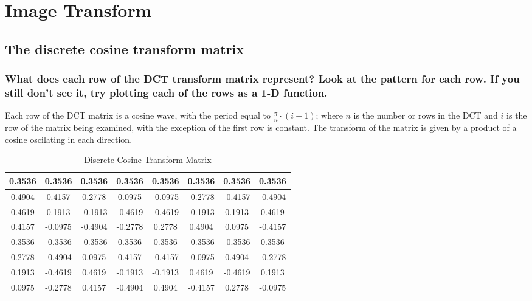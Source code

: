 \section{Image Transform}

\subsection{The discrete cosine transform matrix}

\subsubsection{What does each row of the DCT transform matrix represent? Look at the pattern for each row. If you still don't see it, try plotting each of the rows as a 1-D function.}
Each row of the DCT matrix is a cosine wave, with the period equal to $\frac{\pi}{n} \cdot (i-1)$; where $n$ is the number or rows in the DCT and $i$ is the row of the matrix being examined, with the exception of the first row is constant. The transform of the matrix is given by a product of a cosine oscilating in each direction.

\begin{table}[tbhc]
	\caption{Discrete Cosine Transform Matrix}
	\label{tbl:dctm}
	\begin{center}
		\begin{tabular}{ c | c | c | c | c | c | c | c}
0.3536	&	0.3536	&	0.3536	&	0.3536	&	0.3536	&	0.3536	&	0.3536	&	0.3536	\\
\hline
0.4904	&	0.4157	&	0.2778	&	0.0975	&	-0.0975	&	-0.2778	&	-0.4157	&	-0.4904	\\
\hline
0.4619	&	0.1913	&	-0.1913	&	-0.4619	&	-0.4619	&	-0.1913	&	0.1913	&	0.4619	\\
\hline
0.4157	&	-0.0975	&	-0.4904	&	-0.2778	&	0.2778	&	0.4904	&	0.0975	&	-0.4157	\\
\hline
0.3536	&	-0.3536	&	-0.3536	&	0.3536	&	0.3536	&	-0.3536	&	-0.3536	&	0.3536	\\
\hline
0.2778	&	-0.4904	&	0.0975	&	0.4157	&	-0.4157	&	-0.0975	&	0.4904	&	-0.2778	\\
\hline
0.1913	&	-0.4619	&	0.4619	&	-0.1913	&	-0.1913	&	0.4619	&	-0.4619	&	0.1913	\\
\hline
0.0975	&	-0.2778	&	0.4157	&	-0.4904	&	0.4904	&	-0.4157	&	0.2778	&	-0.0975	\\
		\end{tabular}
	\end{center}
\end{table}


